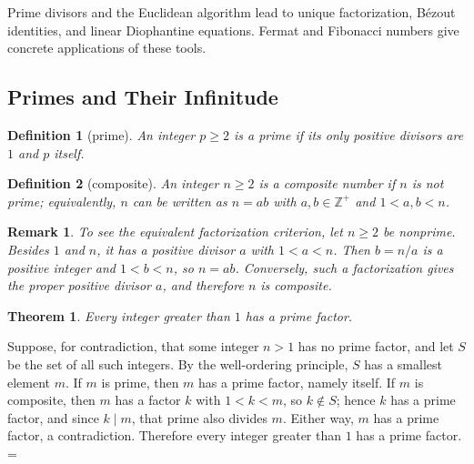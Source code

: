 \documentclass[11pt]{article}
\makeatletter
\let\nt@closedisplay\]
\def\nt@guardedclose{\@ifnextchar\par{\nt@closeafterpar}{\@ifnextchar\end{\postdisplaypenalty\@M\nt@closedisplay}{\nt@closedisplay}}}
\def\nt@closeafterpar\par{\@ifnextchar\par{\nt@closeafterpar}{\@ifnextchar\end{\postdisplaypenalty\@M\nt@closedisplay\par}{\nt@closedisplay\par}}}
\renewenvironment{proof}[1][\proofname]{\par
  \pushQED{\qed}\normalfont\topsep\medskipamount\edef\nt@afterproof{\@endparpenalty=\the\@endparpenalty\relax}\@beginparpenalty\@M\@endparpenalty\@M\let\]\nt@guardedclose\trivlist\item[]\textit{#1\@addpunct{.}} \ignorespaces}{\ifvmode\addpenalty\@M\fi\popQED\nt@afterproof\endtrivlist\@endpefalse}
\theoremstyle{ntstyle}
\newtheorem{theorem}{Theorem}[subsection]
\newtheorem{definition}{Definition}[subsection]
\newtheorem*{remark}{Remark}
\makeatother
\begin{document}
Prime divisors and the Euclidean algorithm lead to unique factorization, Bézout identities, and linear Diophantine
equations. Fermat and Fibonacci numbers give concrete applications of these tools.


\subsection{Primes and Their Infinitude}

\begin{definition}[prime]\label{def:2.1.1}\label{def:prime} An integer $p \ge 2$
  is a prime if its only positive divisors are $1$ and $p$ itself.

\end{definition}

\begin{definition}[composite]\label{def:2.1.2}\label{def:composite} An integer $n \ge 2$ is a
  composite number if $n$ is not prime; equivalently, $n$ can be written as $n = ab$ with $a, b \in \mathbb{Z}^+$
  and $1 < a, b < n$.

\end{definition}

\begin{remark}
  To see the equivalent factorization criterion, let $n\ge2$ be nonprime.
  Besides $1$ and $n$, it has a positive divisor $a$ with $1<a<n$.
  Then $b=n/a$ is a positive integer and $1<b<n$, so $n=ab$.
  Conversely, such a factorization gives the proper positive divisor $a$,
  and therefore $n$ is composite.
\end{remark}

\begin{theorem}\label{thm:2.1.1}\label{thm:prime-divisor-existence} Every integer greater than $1$ has
  a prime factor.

\end{theorem}

\begin{proof} Suppose, for contradiction, that some
  integer $n > 1$ has no prime factor, and let $S$ be the set of all
  such integers. By the well-ordering principle, $S$ has a smallest
  element $m$. If $m$ is prime, then $m$ has a prime factor, namely
  itself. If $m$ is composite, then $m$ has a factor
  $k$ with $1 < k < m$, so $k \notin S$; hence $k$ has a prime factor,
  and since $k \mid m$, that prime also divides $m$. Either way, $m$ has
  a prime factor, a contradiction. Therefore every integer greater than
  $1$ has a prime factor.
\end{proof}
\end{document}
